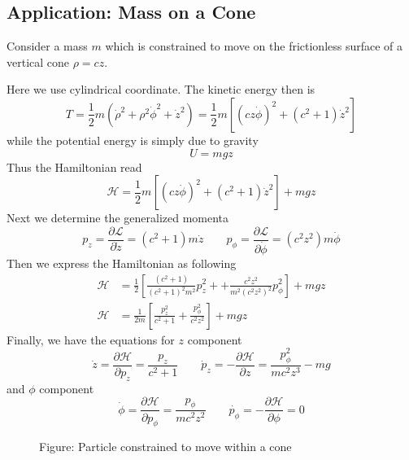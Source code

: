 \documentclass[../../../main.tex]{subfiles}
\begin{document}
\subsection{Application: Mass on a Cone}
Consider a mass $m$ which is constrained to move on the frictionless surface of a vertical cone $\rho=cz$.

Here we use cylindrical coordinate. 
The kinetic energy then is 
\begin{equation*}
   T=\frac{1}{2}m\left(\dot{\rho}^2+\rho^2\dot{\phi}^2+\dot{z}^2\right)=\frac{1}{2}m\left[(cz\dot{\phi})^2+(c^2+1)\dot{z}^2\right]
\end{equation*}
while the potential energy is simply due to gravity
\begin{equation*}
    U=mgz
\end{equation*}
Thus the Hamiltonian read
\begin{equation*}
   \mathcal{H}=\frac{1}{2}m\left[(cz\dot{\phi})^2+(c^2+1)\dot{z}^2\right]+mgz
\end{equation*}
Next we determine the generalized momenta 
\begin{equation*}
   p_z=\frac{\partial\mathcal{L}}{\partial \dot{z}}=(c^2+1)m\dot{z}\qquad p_\phi=\frac{\partial\mathcal{L}}{\partial \dot{\phi}}=(c^2z^2)m\dot{\phi}
\end{equation*}
Then we express the Hamiltonian as following
\begin{align*}
   \mathcal{H}&=\frac{1}{2}\left[\frac{(c^2+1)}{(c^2+1)^2m^2}p_z^2++\frac{c^2z^2}{m^2(c^2z^2)^2}p_\phi^2\right]+mgz\\
   \mathcal{H}&=\frac{1}{2m}\left[\frac{p_z^2}{c^2+1}+\frac{p_\phi^2}{c^2z^2}\right]+mgz
\end{align*}
Finally, we have the equations for $z$ component
\begin{equation*}
   \dot{z}=\frac{\partial\mathcal{H}}{\partial p_z}=\frac{p_z}{c^2+1}\qquad \dot{p}_z=-\frac{\partial\mathcal{H}}{\partial z}=\frac{p_\phi^2}{mc^2z^3}-mg
\end{equation*}
and $\phi$ component
\begin{equation*}
   \dot{\phi}=\frac{\partial\mathcal{H}}{\partial p_\phi}=\frac{p_\phi}{mc^2z^2}\qquad \dot{p_\phi}=-\frac{\partial\mathcal{H}}{\partial \phi}=0
\end{equation*}


\begin{figure*}
	\centering
	\caption*{Figure: Particle constrained to move within a cone}
\end{figure*}
\end{document}
